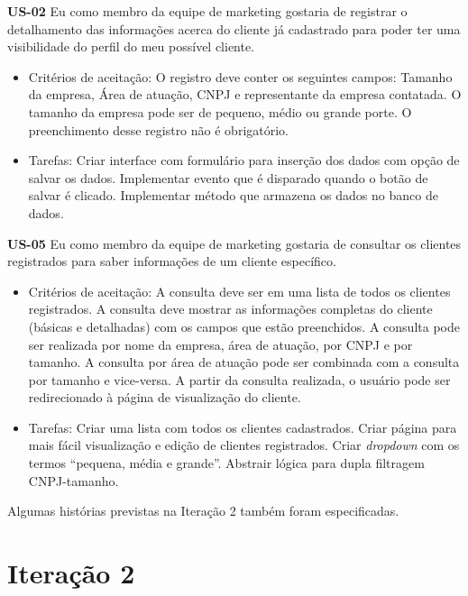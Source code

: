\textbf{US-02} Eu como membro da equipe de marketing gostaria de registrar o detalhamento das informações acerca do cliente já cadastrado para poder ter uma visibilidade do perfil do meu possível cliente.

\begin{itemize}
 \item Critérios de aceitação:
\subitem O registro deve conter os seguintes campos: Tamanho da empresa, Área de atuação, CNPJ e representante da empresa contatada.
\subitem O tamanho da empresa pode ser de pequeno, médio ou grande porte.
\subitem O preenchimento desse registro não é obrigatório.

\item Tarefas:
\subitem Criar interface com formulário para inserção dos dados com opção de salvar os dados.
\subitem Implementar evento que é disparado quando o botão de salvar é clicado.
\subitem Implementar método que armazena os dados no banco de dados.


\end{itemize}

\textbf{US-05} Eu como membro da equipe de marketing gostaria de consultar os clientes registrados para saber informações de um cliente específico.

\begin{itemize} 
\item Critérios de aceitação:
\subitem A consulta deve ser em uma lista de todos os clientes registrados.
\subitem A consulta deve mostrar as informações completas do cliente (básicas e detalhadas) com os campos que estão preenchidos.
\subitem A consulta pode ser realizada por nome da empresa, área de atuação, por CNPJ e por tamanho.
\subitem A consulta por área de atuação pode ser combinada com a consulta por tamanho e vice-versa.
\subitem A partir da consulta realizada, o usuário pode ser redirecionado à página de visualização do cliente.

\item Tarefas:
\subitem Criar uma lista com todos os clientes cadastrados.
\subitem Criar página para mais fácil visualização e edição de clientes registrados.
\subitem Criar \textit{dropdown} com os termos “pequena, média e grande”.
\subitem Abstrair lógica para dupla filtragem CNPJ-tamanho.
\end{itemize}


Algumas histórias previstas na Iteração 2 também foram especificadas.
\section{Iteração 2}

